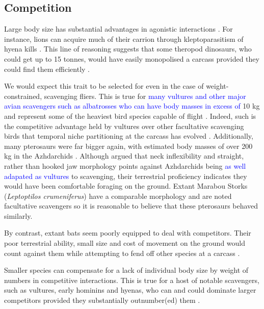 \documentclass[a4paper,12pt]{article}
\begin{document}
\subsection{Competition}
Large body size has substantial advantages in agonistic interactions \textcolor{blue}{\citep{ruxton2004obligate,moleon2014inter,pereira2014facultative}}. 
For instance, lions can acquire much of their carrion through kleptoparasitism of hyena kills \textcolor{blue}{\citep{trinkel2005competitive,pereira2014facultative,periquet2015lion}}. 
This line of reasoning suggests that some theropod dinosaurs, who could get up to 15 tonnes, would have easily monopolised a carcass \citep{weishampel2004dinosauria} provided they could find them efficiently \citep{kane2016body}. 

We would expect this trait to be selected for even in the case of weight-constrained, scavenging fliers.
This is true for \textcolor{blue}{many vultures and other major avian scavengers such as albatrosses who can have body masses in excess of} 10 kg and represent some of the heaviest bird species capable of flight \citep{weimerskirch1992reproductive,ferguson2001raptors,donazar2002effects}.
Indeed, such is the competitive advantage held by vultures over other facultative scavenging birds that temporal niche partitioning at the carcass has evolved \textcolor{blue}{\citep{kendall2013alternative,KaneVul,moreno2016behavioral}}. 
Additionally, many pterosaurs were far bigger again, with estimated body masses of over 200 kg in the Azhdarchids \citep{witton2010size}.
Although \cite{witton2008reappraisal} argued that neck inflexibility and straight, rather than hooked jaw morphology points against Azhdarchids being \textcolor{blue}{as well adapated as vultures} to scavenging, their terrestrial proficiency indicates they would have been comfortable foraging on the ground.
Extant Marabou Storks (\textit{Leptoptilos crumeniferus}) have a comparable morphology and are noted facultative scavengers \citep{monadjem2012survival} so it is reasonable to believe that these pterosaurs behaved similarly.

By contrast, extant bats seem poorly equipped to deal with competitors. 
Their poor terrestrial ability, small size and cost of movement on the ground would count against them while attempting to fend off other species at a carcass \citep{riskin2006terrestrial,voigt2012terrestrial}.

Smaller species can compensate for a lack of individual body size by weight of numbers in competitive interactions. 
This is true for a host of notable scavengers, such as vultures, early hominins and hyenas, who can and could dominate larger competitors provided they substantially outnumber(ed) them \citep{KaneVul,trinkel2005competitive,ruxton2013endurance}. 
\end{document}
